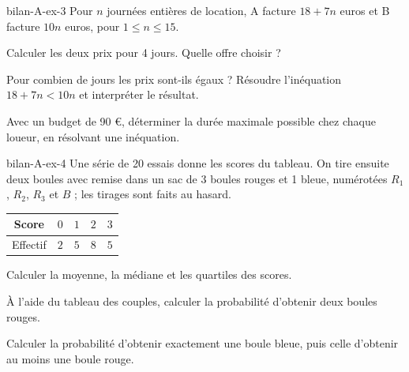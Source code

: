 \begin{blocEdition}{bilan-A-ex-3}
Pour $n$ journées entières de location, A facture $18+7n$ euros et B facture $10n$ euros, pour $1\le n\le15$.\begin{questions}
\item Calculer les deux prix pour 4 jours. Quelle offre choisir ?
\item Pour combien de jours les prix sont-ils égaux ? Résoudre l’inéquation $18+7n<10n$ et interpréter le résultat.
\item Avec un budget de 90 €, déterminer la durée maximale possible chez chaque loueur, en résolvant une inéquation.
\end{questions}\par{}\label{fig-bilan-A-ex-3}

\end{blocEdition}
\begin{blocEdition}{bilan-A-ex-4}
Une série de 20 essais donne les scores du tableau. On tire ensuite deux boules avec remise dans un sac de 3 boules rouges et 1 bleue, numérotées $R_1$, $R_2$, $R_3$ et $B$ ; les tirages sont faits au hasard.\begin{center}\renewcommand{\arraystretch}{1.35}\begin{tabular}{c|cccc}\toprule
Score & $0$ & $1$ & $2$ & $3$\\\midrule
Effectif & $2$ & $5$ & $8$ & $5$\\
\bottomrule\end{tabular}\end{center}\begin{questions}
\item Calculer la moyenne, la médiane et les quartiles des scores.
\item À l’aide du tableau des couples, calculer la probabilité d’obtenir deux boules rouges.
\item Calculer la probabilité d’obtenir exactement une boule bleue, puis celle d’obtenir au moins une boule rouge.
\end{questions}\par{}\label{fig-bilan-A-ex-4}

\end{blocEdition}
